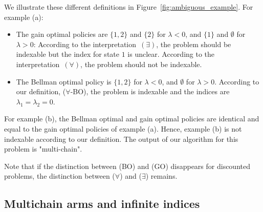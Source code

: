 We illustrate these different definitions in Figure~\ref{fig:ambiguous_example}. For example (a):
\begin{itemize}
    \item The gain optimal policies are $\{1,2\}$ and $\{2\}$ for $\lambda<0$, and $\{1\}$ and $\emptyset$ for $\lambda>0$: According to the interpretation~$(\exists)$, the problem should be indexable but the index for state $1$ is unclear. According to the interpretation~$(\forall)$, the problem should not be indexable.
    \item The Bellman optimal policy is $\{1,2\}$ for $\lambda<0$, and $\emptyset$ for $\lambda>0$. According to our definition, ($\forall$-BO), the problem is indexable and the indices are $\lambda_1=\lambda_2=0$.
\end{itemize}
For example (b), the Bellman optimal and gain optimal policies are identical and equal to the gain optimal policies of example (a). Hence, example (b) is not indexable according to our definition. The output of our algorithm for this problem is "multi-chain". 

Note that if the distinction between (BO) and (GO) disappears for discounted problems, the distinction between ($\forall$) and ($\exists$) remains.

\subsection{Multichain arms and infinite indices}
\label{apx:multichain}

